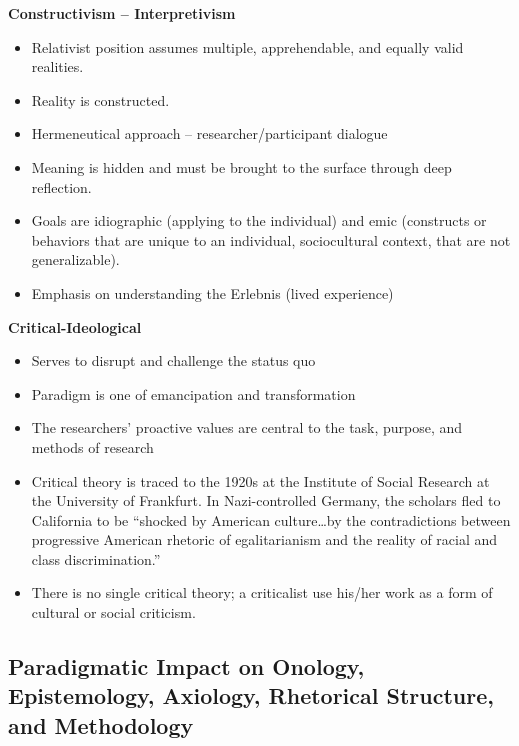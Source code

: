 \documentclass[
  english,
]{book}
\providecommand{\tightlist}{%
  \setlength{\itemsep}{0pt}\setlength{\parskip}{0pt}}
\begin{document}
\textbf{Constructivism -- Interpretivism}

\begin{itemize}
\tightlist
\item
  Relativist position assumes multiple, apprehendable, and equally valid realities.
\item
  Reality is constructed.
\item
  Hermeneutical approach -- researcher/participant dialogue
\item
  Meaning is hidden and must be brought to the surface through deep reflection.
\item
  Goals are idiographic (applying to the individual) and emic (constructs or behaviors that are unique to an individual, sociocultural context, that are not generalizable).
\item
  Emphasis on understanding the Erlebnis (lived experience)
\end{itemize}

\textbf{Critical-Ideological}

\begin{itemize}
\tightlist
\item
  Serves to disrupt and challenge the status quo
\item
  Paradigm is one of emancipation and transformation
\item
  The researchers' proactive values are central to the task, purpose, and methods of research
\item
  Critical theory is traced to the 1920s at the Institute of Social Research at the University of Frankfurt. In Nazi-controlled Germany, the scholars fled to California to be ``shocked by American culture\ldots by the contradictions between progressive American rhetoric of egalitarianism and the reality of racial and class discrimination.''
\item
  There is no single critical theory; a criticalist use his/her work as a form of cultural or social criticism.
\end{itemize}

\hypertarget{paradigmatic-impact-on-onology-epistemology-axiology-rhetorical-structure-and-methodology}{%
\subsection{Paradigmatic Impact on Onology, Epistemology, Axiology, Rhetorical Structure, and Methodology}\label{paradigmatic-impact-on-onology-epistemology-axiology-rhetorical-structure-and-methodology}}
\end{document}
